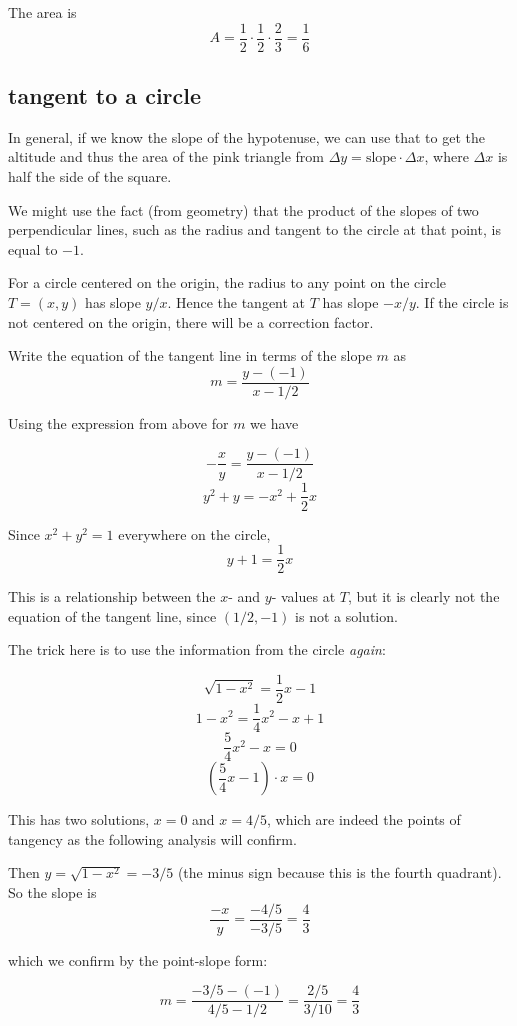 \documentclass[11pt, oneside]{article}
\begin{document}
The area is
\[ A = \frac{1}{2} \cdot \frac{1}{2} \cdot \frac{2}{3} =  \frac{1}{6}  \]

\subsection*{tangent to a circle}

In general, if we know the slope of the hypotenuse, we can use that to get the altitude and thus the area of the pink triangle from $\Delta y = \text{slope} \cdot \Delta x$, where $\Delta x$ is half the side of the square.

We might use the fact (from geometry) that the product of the slopes of two perpendicular lines, such as the radius and tangent to the circle at that point, is equal to $-1$.  

For a circle centered on the origin, the radius to any point on the circle $T = (x,y)$ has slope $y/x$.  Hence the tangent at $T$ has slope $-x/y$.  If the circle is not centered on the origin, there will be a correction factor.

Write the equation of the tangent line in terms of the slope $m$ as
\[ m =  \frac{y - (-1)}{x - 1/2} \]

Using the expression from above for $m$ we have 

\[ -\frac{x}{y} =  \frac{y - (-1)}{x - 1/2} \]
\[ y^2 + y = -x^2 + \frac{1}{2} x \]

Since $x^2 + y^2 = 1$ everywhere on the circle,
\[ y + 1 = \frac{1}{2} x  \]

This is a relationship between the $x$- and $y$- values at $T$, but it is clearly not the equation of the tangent line, since $(1/2,-1)$ is not a solution.  

The trick here is to use the information from the circle \emph{again}:

\[ \sqrt{1 - x^2} = \frac{1}{2} x - 1 \]
\[ 1 - x^2 = \frac{1}{4}x^2 - x + 1 \]
\[ \frac{5}{4}x^2 - x = 0 \]
\[ (\frac{5}{4}x - 1) \cdot x = 0 \]

This has two solutions, $x = 0$ and $x = 4/5$, which are indeed the points of tangency as the following analysis will confirm.

Then $y = \sqrt{1 - x^2} = -3/5$ (the minus sign because this is the fourth quadrant).  So the slope is 
\[ \frac{-x}{y} = \frac{-4/5}{-3/5} = \frac{4}{3} \]

which we confirm by the point-slope form:

\[ m = \frac{-3/5 - (-1)}{4/5 - 1/2} = \frac{2/5}{3/10} = \frac{4}{3} \]
\end{document}
